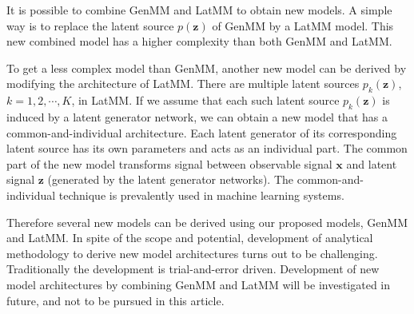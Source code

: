 It is possible to combine GenMM and LatMM to obtain new models. A simple way is to replace the latent source $p(\bm{z})$ of GenMM by a LatMM model. 
This new combined model has a higher complexity than both GenMM and LatMM. %

To get a less complex model than GenMM, another new model can be derived by modifying the architecture of LatMM. There are multiple latent sources $p_k(\bm{z})$, $k=1, 2, \cdots, K$, in LatMM. If we assume that each such latent source $p_k(\bm{z})$ is induced by a latent generator network, we can obtain a new model that has a common-and-individual architecture. Each latent generator of its corresponding latent source has its own parameters and acts as an individual part. The common part of the new model transforms signal between observable signal $\bm{x}$ and latent signal $\bm{z}$ (generated by the latent generator networks). The common-and-individual technique is prevalently used in machine learning systems\cite{sundman2016design, SUNDMAN2014298}.


Therefore several new models can be derived using our proposed models, GenMM and LatMM. In spite of the scope and potential, development of analytical methodology to derive new model architectures turns out to be challenging. Traditionally the development is trial-and-error driven. Development of new model architectures by combining GenMM and LatMM will be investigated in future, and not to be pursued in this article.   




